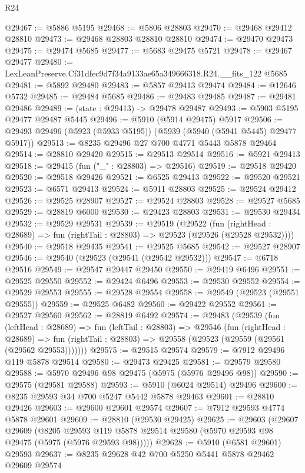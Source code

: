 \begin{lexlean}{R24}
\begin{coremodule}
@29467 := @5886 @5195
@29468 := @5806 @28803
@29470 := @29468 @29412 @28810
@29473 := @29468 @28803 @28810 @28810
@29474 := @29470 @29473
@29475 := @29474 @5685
@29477 := @5683 @29475 @5721
@29478 := @29467 @29477
@29480 := LexLeanPreserve.Cf31dfec9d7f34a9133ae65a349666318.R24.__fits_122 @5685
@29481 := @5892 @29480
@29483 := @5857 @29413 @29474
@29484 := @12646 @5732
@29485 := @29484 @5685
@29486 := @29483 @29485
@29487 := @29481 @29486
@29489 := (state : @29413) -> @29478 @29487
@29493 := @5903 @5195 @29477 @29487 @5445
@29496 := @5910 (@5914 @29475) @5917
@29506 := @29493 @29496 (@5923 (@5933 @5195)) (@5939 (@5940 (@5941 @5445) @29477 @5917))
@29513 := @8235 @29496 @27 @700 @4771 @5443 @5878 @29464
@29514 := @28810 @29420
@29515 := @29513 @29514
@29516 := @5921 @29413
@29518 := @29415 (fun ("_" : @28803) => @29516)
@29519 := @29518 @29420
@29520 := @29518 @29426
@29521 := @6525 @29413
@29522 := @29520 @29521
@29523 := @6571 @29413
@29524 := @5911 @28803
@29525 := @29524 @29412
@29526 := @29525 @28907
@29527 := @29524 @28803
@29528 := @29527 @5685
@29529 := @28819 @6000
@29530 := @29423 @28803
@29531 := @29530 @29434
@29532 := @29529 @29531
@29539 := @29519
    (@29522
      (fun (rightHead : @28689) => fun (rightTail : @28803) => @29523 (@29526 (@29528 @29532))))
@29540 := @29518 @29435
@29541 := @29525 @5685
@29542 := @29527 @28907
@29546 := @29540 (@29523 (@29541 (@29542 @29532)))
@29547 := @6718 @29516
@29549 := @29547 @29447 @29450
@29550 := @29419 @6496
@29551 := @29525 @29550
@29552 := @29424 @6496
@29553 := @29530 @29552
@29554 := @29529 @29553
@29555 := @29528 @29554
@29558 := @29549 (@29523 (@29551 @29555))
@29559 := @29525 @6482
@29560 := @29422 @29552
@29561 := @29527 @29560
@29562 := @28819 @6492
@29574 := @29483
    (@29539
      (fun (leftHead : @28689) =>
      fun (leftTail : @28803) =>
      @29546
        (fun (rightHead : @28689) =>
        fun (rightTail : @28803) => @29558 (@29523 (@29559 (@29561 (@29562 @29553)))))))
@29575 := @29515 @29574
@29579 := @7912 @29496 @119 @5878 @29514
@29580 := @29473 @29425
@29581 := @29579 @29580
@29588 := @5970 @29496 @98 @29475 (@5975 (@5976 @29496 @98))
@29590 := @29575 (@29581 @29588)
@29593 := @5910 (@6024 @29514) @29496
@29600 := @8235 @29593 @34 @700 @5247 @5442 @5878 @29463
@29601 := @28810 @29426
@29603 := @29600 @29601 @29574
@29607 := @7912 @29593 @4774 @5878 @29601
@29609 := @28810 (@29530 @29425)
@29625 := @29603
    (@29607
      @29609
      (@8205 @29593 @119 @5878 @29514 @29580 (@5970 @29593 @98 @29475 (@5975 (@5976 @29593 @98)))))
@29628 := @5910 (@6581 @29601) @29593
@29637 := @8235 @29628 @42 @700 @5250 @5441 @5878 @29462 @29609 @29574

\end{coremodule}
\end{lexlean}
